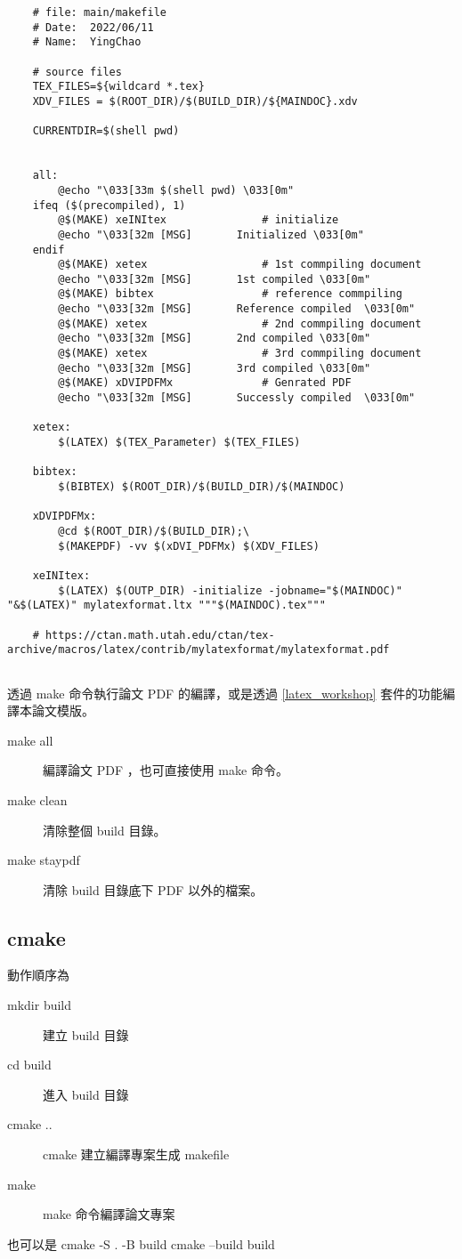  \begin{lstlisting}
    # file: main/makefile
    # Date:  2022/06/11
    # Name:  YingChao
    
    # source files
    TEX_FILES=${wildcard *.tex}
    XDV_FILES = $(ROOT_DIR)/$(BUILD_DIR)/${MAINDOC}.xdv
    
    CURRENTDIR=$(shell pwd)
    
    
    all:
        @echo "\033[33m $(shell pwd) \033[0m"
    ifeq ($(precompiled), 1)
        @$(MAKE) xeINItex				# initialize
        @echo "\033[32m [MSG] 		Initialized \033[0m"
    endif
        @$(MAKE) xetex					# 1st commpiling document
        @echo "\033[32m [MSG] 		1st compiled \033[0m"
        @$(MAKE) bibtex					# reference commpiling
        @echo "\033[32m [MSG] 		Reference compiled  \033[0m"
        @$(MAKE) xetex					# 2nd commpiling document
        @echo "\033[32m [MSG] 		2nd compiled \033[0m"
        @$(MAKE) xetex					# 3rd commpiling document 
        @echo "\033[32m [MSG] 		3rd compiled \033[0m"
        @$(MAKE) xDVIPDFMx				# Genrated PDF
        @echo "\033[32m [MSG] 		Successly compiled  \033[0m"
    
    xetex:
        $(LATEX) $(TEX_Parameter) $(TEX_FILES)
    
    bibtex:
        $(BIBTEX) $(ROOT_DIR)/$(BUILD_DIR)/$(MAINDOC)
    
    xDVIPDFMx:
        @cd $(ROOT_DIR)/$(BUILD_DIR);\
        $(MAKEPDF) -vv $(xDVI_PDFMx) $(XDV_FILES)
    
    xeINItex:
        $(LATEX) $(OUTP_DIR) -initialize -jobname="$(MAINDOC)" "&$(LATEX)" mylatexformat.ltx """$(MAINDOC).tex""" 
    
    # https://ctan.math.utah.edu/ctan/tex-archive/macros/latex/contrib/mylatexformat/mylatexformat.pdf
    
 \end{lstlisting}
 

透過 make 命令執行論文 PDF 的編譯，或是透過 \ref*{latex_workshop} 套件的功能編譯本論文模版。

\begin{description}
    \item[make all] 編譯論文 PDF ，也可直接使用 make 命令。
    \item[make clean] 清除整個 build 目錄。
    \item[make staypdf] 清除 build 目錄底下 PDF 以外的檔案。
\end{description}

\subsection{cmake}

動作順序為

\begin{description}
    \item[mkdir build] 建立 build 目錄
    \item[cd build]  進入 build 目錄
    \item[cmake ..]  cmake 建立編譯專案生成 makefile
    \item[make]      make 命令編譯論文專案
\end{description}


也可以是 \newline
cmake -S . -B build \newline
cmake --build build \newline